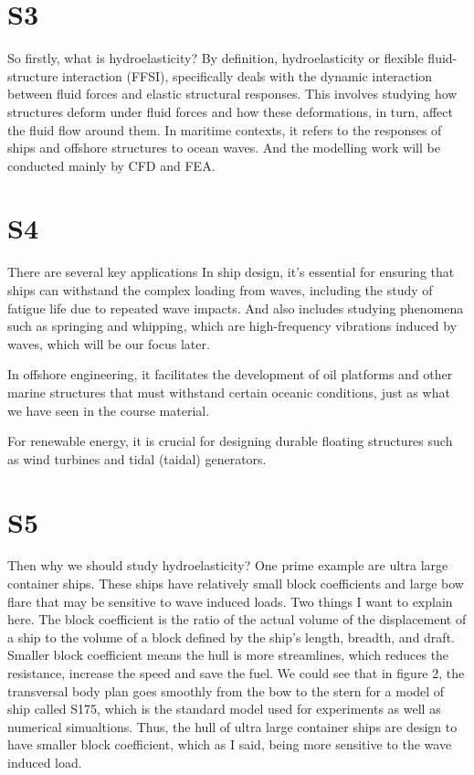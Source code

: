 \documentclass[17pt]{extarticle} %
\begin{document}
\setlength{\parskip}{1em} 
\setlength{\parindent}{0pt}
\newcommand{\vect}[1]{\mathbf{#1}}


\section*{S3}
So firstly, what is hydroelasticity? By definition, hydroelasticity or flexible fluid-structure interaction (FFSI), specifically deals with the dynamic interaction 
between fluid forces and elastic structural responses. This involves studying how structures deform under fluid forces and how these deformations, in turn, affect the fluid flow around them.
In maritime contexts, it refers to the responses of ships and offshore structures to ocean waves. And the modelling work will be conducted mainly by CFD and FEA.

\section*{S4}
There are several key applications
In ship design, it's essential for ensuring that ships can withstand the complex loading from waves, including the study of fatigue life due to repeated wave impacts.
And also includes studying phenomena such as springing and whipping, which are high-frequency vibrations induced by waves, which will be our focus later.

In offshore engineering, it facilitates the development of oil platforms and other marine structures that must withstand certain oceanic conditions, just as what we have seen in the course material.

For renewable energy, it is crucial for designing durable floating structures such as wind turbines and tidal (taidal) generators.

\section*{S5}
Then why we should study hydroelasticity?
One prime example are ultra large container ships. These ships have relatively small block coefficients and large bow flare
that may be sensitive to wave induced loads. Two things I want to explain here. The block coefficient is the ratio of the actual volume of the displacement of a ship 
to the volume of a block defined by the ship's length, breadth, and draft. Smaller block coefficient means the hull is more streamlines, which reduces the resistance, 
increase the speed and save the fuel. 
We could see that in figure 2, the transversal body plan goes smoothly from the bow to the stern for a model of ship called S175, which is the standard model used 
for experiments as well as numerical simualtions. 
Thus, the hull of ultra large container ships are design to have smaller block coefficient, which as I said, being more sensitive to the wave induced load.
\end{document}
